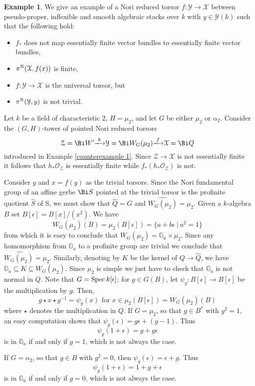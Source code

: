 \documentclass[12pt,reqno]{amsart}
\theoremstyle{plain}
\theoremstyle{definition}
\newtheorem{ex}[thm]{Example}
\numberwithin{thm}{section}
\newcounter{x}\setcounter{x}{1}
\theoremstyle{plain}
\begin{document}
\begin{ex}\label{counterexample no H1 exact sequence}
We give an example of a Nori reduced torsor $f\colon {\mathcal{Y}}{\longrightarrow} {\mathcal{X}}$ between 
pseudo-proper, inflexible and smooth algebraic stacks over $k$ with $y\in {\mathcal{Y}}(k)$ 
such that the following hold:
\begin{itemize}
\item $f_*$ does not map essentially finite vector bundles to essentially 
finite vector bundles,

\item $\pi^{\textup{N}}({\mathcal{X}},f(x))$ is finite,

\item $f\colon {\mathcal{Y}}{\longrightarrow} {\mathcal{X}}$ is 
the universal torsor, but 

\item $\pi^{\textup{N}}({\mathcal{Y}},y)$ is not trivial.
\end{itemize} 

Let $k$ be a field of characteristic $2$, $H=\mu_2$, and let $G$ be either $\mu_2$ or 
$\alpha_2$. Consider the $(G,H)$-tower of pointed Nori reduced torsors 
$${\mathcal{Z}}=\Bi W'{\xlongrightarrow{h}} {\mathcal{Y}}=\Bi W_G(\mu_2){\xlongrightarrow{f}} {\mathcal{X}}=\Bi Q$$ introduced in Example
\ref{counterexample 1}. Since ${\mathcal{Z}}{\longrightarrow} {\mathcal{X}}$ is not essentially finite it follows 
that $h_*{\mathcal{O}_{\mathcal{Z}}}$ is essentially finite while $f_*(h_*{\mathcal{O}_{\mathcal{Z}}})$ is not.
 
Consider $y$ and $x=f(y)$ as the trivial torsors. Since the Nori fundamental group of
an affine gerbe $\Bi S$ pointed at the trivial torsor is the profinite quotient $\widehat S$ of S, we must show that $\widehat Q=G$ and $\widehat{W_G(\mu_2)}=\mu_2$. Given a $k$-algebra $B$ set $B[\epsilon]=B[x]/(x^2)$. We have
 \[
 W_G(\mu_2)(B)=\mu_2(B[\epsilon])=\{a+b\epsilon {\ | \ } a^2=1\}
 \]
 from which it is easy to conclude that $W_G(\mu_2)={{\mathbb G}}_a \times \mu_2$. Since any
homomorphism from ${{\mathbb G}}_a$ to a profinite group are trivial we conclude that
$\widehat{W_G(\mu_2)}=\mu_2$. Similarly, denoting by $K$ be the kernel of
$Q{\longrightarrow} \widehat Q$, we have ${{\mathbb G}}_a\subseteq K \subseteq W_G(\mu_2)$. Since $\mu_2$ is
simple we just have to check that ${{\mathbb G}}_a$ is not normal in $Q$. Note that
$G={{\rm Spec \,}} k[\epsilon]$; for $g\in G(B)$, let $\psi_g\colon B[\epsilon]{\longrightarrow}
B[\epsilon]$ be the multiplication by $g$. Then,
 \[
 g\star x \star g^{-1} = \psi_g(x) \text{ for } x\in \mu_2(B[\epsilon])=W_G(\mu_2)(B)
 \]
 where $\star$ denotes the multiplication in $Q$. If $G=\mu_2$, so that $g\in B^*$ with $g^2=1$, an easy computation shows that $\psi_g(\epsilon)=g\epsilon + (g-1)$. Thus
 $$
 \psi_g(1+\epsilon)=g + g\epsilon 
 $$
 is in ${{\mathbb G}}_a$ if and only if $g=1$, which is not always the case.
 
 If $G=\alpha_2$, so that $g\in B$ with $g^2=0$, then $\psi_g(\epsilon)=\epsilon + g$. Thus
 \[
 \psi_g(1+\epsilon)=1+g + \epsilon 
 \]
 is in ${{\mathbb G}}_a$ if and only if $g=0$, which is not always the case.
\end{ex}
\end{document}
